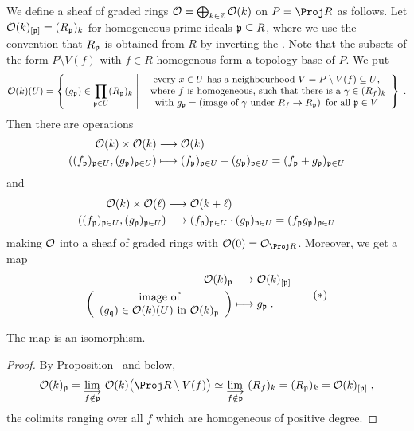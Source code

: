 \documentclass[a4paper,parskip=half,numbers=enddot, DIV=12]{scrreprt}
\begin{document}
We define a sheaf of graded rings $\mathcal{O}=\bigoplus_{k\in\mathbb{Z}}\mathcal{O}(k)$ on $P=\Proj R$ as follows. Let $\mathcal{O}(k)_{[\mathfrak{p}]}=(R_{\mathfrak{p}})_k$ for homogeneous prime ideals $\mathfrak{p}\subseteq R$, where we use the convention that $R_{\mathfrak{p}}$ is obtained from $R$ by inverting the . Note that the subsets of the form $P\setminus V(f)$ with $f\in R$ homogenous form a topology base of $P$. We put
\begin{align*}
	\Oo(k)(U)=\left\{(g_\pp)\in\prod_{\pp\in U}(R_\pp)_k\st\begin{array}{c}
		\text{every }x\in U\text{ has a neighbourhood }V=P\setminus V(f)\subseteq U\text{,}\\
		\text{ where }f\text{ is homogeneous,  such that there is a }\gamma\in (R_f)_k\\
		\text{with }g_\pp=\left(\text{image of }\gamma\text{ under }R_f\morphism R_\pp\right)\text{ for all }\pp\in V
	\end{array}\right\}\;.
\end{align*}
Then there are operations
\begin{align*}
	\Oo(k)\times \Oo(k)&\morphism \Oo(k)\\
	\left((f_\pp)_{\pp\in U},(g_\pp)_{\pp\in U}\right)&\longmapsto (f_\pp)_{\pp\in U}+(g_\pp)_{\pp\in U}=(f_\pp+g_\pp)_{\pp\in U}
\end{align*}
and
\begin{align*}
	\Oo(k)\times \Oo(\ell)&\morphism \Oo(k+\ell)\\
	\left((f_\pp)_{\pp\in U},(g_\pp)_{\pp\in U}\right)&\longmapsto (f_\pp)_{\pp\in U}\cdot (g_\pp)_{\pp\in U}=(f_\pp g_\pp)_{\pp\in U}	
\end{align*}
making $\mathcal{O}$ into a sheaf of graded rings with $\Oo(0)=\Oo_{\Proj R}$. Moreover, we get a map
\begin{align}\lbl{eq:ProjPretenderStalk}
	\begin{split}
		\Oo(k)_\pp&\morphism\Oo(k)_{[\pp]}\\
		\left(\begin{array}{c}
			\text{image of}\\
			(g_\qq)\in\Oo(k)(U)\text{ in }\Oo(k)_\pp
		\end{array}\right)&\longmapsto g_\pp\;.
	\end{split}\tag{$*$}
\end{align}
\begin{fact}
	The map  is an isomorphism.
\end{fact}
\begin{proof}
	By Proposition~ and  below, 
	\begin{align*}
		\Oo(k)_\pp=\colimit[f\notin \pp]\Oo(k)\big(\Proj R\setminus V(f)\big)\simeq \colimit[f\notin\pp](R_f)_k=(R_\pp)_k=\Oo(k)_{[\pp]}\;,
	\end{align*}
	the colimits ranging over all $f$ which are homogeneous of positive degree.
\end{proof}
\end{document}
